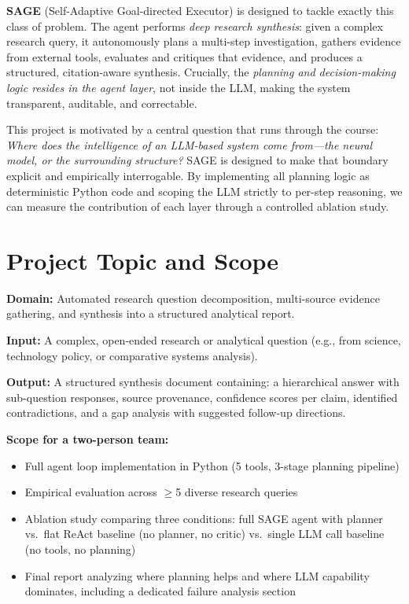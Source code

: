 \documentclass[11pt]{article}
\begin{document}
\textbf{SAGE} (Self-Adaptive Goal-directed Executor) is designed to tackle exactly this
class of problem. The agent performs \emph{deep research synthesis}: given a complex
research query, it autonomously plans a multi-step investigation, gathers evidence from
external tools, evaluates and critiques that evidence, and produces a structured,
citation-aware synthesis. Crucially, the \emph{planning and decision-making logic resides
in the agent layer}, not inside the LLM, making the system transparent, auditable, and
correctable.

This project is motivated by a central question that runs through the course:
\textit{Where does the intelligence of an LLM-based system come from---the neural model,
or the surrounding structure?} SAGE is designed to make that boundary explicit and
empirically interrogable. By implementing all planning logic as deterministic Python code and scoping the LLM strictly to per-step reasoning, we can measure the contribution of each layer through a controlled ablation study.

\section{Project Topic and Scope}

\textbf{Domain:} Automated research question decomposition, multi-source evidence
gathering, and synthesis into a structured analytical report.

\textbf{Input:} A complex, open-ended research or analytical question (e.g., from
science, technology policy, or comparative systems analysis).

\textbf{Output:} A structured synthesis document containing: a hierarchical answer with
sub-question responses, source provenance, confidence scores per claim, identified
contradictions, and a gap analysis with suggested follow-up directions.

\textbf{Scope for a two-person team:}
\begin{itemize}[leftmargin=1.5em, itemsep=2pt]
  \item Full agent loop implementation in Python (5 tools, 3-stage planning pipeline)
  \item Empirical evaluation across $\geq$5 diverse research queries
  \item Ablation study comparing three conditions: full SAGE agent with planner vs.\ flat ReAct baseline (no planner, no critic) vs.\ single LLM call baseline (no tools, no planning)
  \item Final report analyzing where planning helps and where LLM capability dominates, including a dedicated failure analysis section
\end{itemize}
\end{document}
